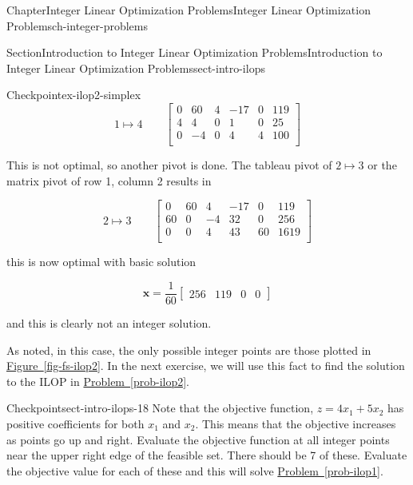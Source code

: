 \documentclass[oneside,10pt,]{book}
\newcommand{\xreffont}{\relax}
\numberwithin{equation}{section}
\newcommand{\amp}{&}
\begin{document}
\begin{chapterptx}{Chapter}{Integer Linear Optimization Problems}{}{Integer Linear Optimization Problems}{}{}{ch-integer-problems}
\begin{sectionptx}{Section}{Introduction to Integer Linear Optimization Problems}{}{Introduction to Integer Linear Optimization Problems}{}{}{sect-intro-ilops}
\begin{inlineexercise}{Checkpoint}{}{ex-ilop2-simplex}
\begin{equation*}
1 \mapsto 4 \qquad \left[\begin{array}{rr|rrr|r} 0 \amp 60 \amp 4 \amp -17 \amp 0 \amp 119\\ 4 \amp 4 \amp 0 \amp 1 \amp 0 \amp 25\\ \hline 0 \amp -4 \amp 0 \amp 4 \amp 4 \amp 100\\ \end{array} \right]
\end{equation*}
%
\par
This is not optimal, so another pivot is done. The tableau pivot of \(2 \mapsto 3\) or the matrix pivot of row 1, column 2 results in%
\par
%
\begin{equation*}
2 \mapsto 3 \qquad \left[\begin{array}{rr|rrr|r} 0 \amp 60 \amp 4 \amp -17 \amp 0 \amp 119\\ 60 \amp 0 \amp -4 \amp 32 \amp 0 \amp 256\\ \hline 0 \amp 0 \amp 4 \amp 43 \amp 60 \amp 1619\\ \end{array} \right]
\end{equation*}
%
\par
this is now optimal with basic solution%
\par
%
\begin{equation*}
\boldsymbol{x} = \frac{1}{60} \left[\begin{array}{rr|rr} 256 \amp 119 \amp 0 \amp 0 \end{array}\right]
\end{equation*}
%
\par
and this is clearly not an integer solution.%
\end{inlineexercise}%
As noted, in this case, the only possible integer points are those plotted in \hyperref[fig-fs-ilop2]{Figure~{\xreffont\ref{fig-fs-ilop2}}}. In the next exercise, we will use this fact to find the solution to the ILOP in \hyperref[prob-ilop2]{Problem~{\xreffont\ref{prob-ilop2}}}.%
\begin{inlineexercise}{Checkpoint}{}{sect-intro-ilops-18}%
Note that the objective function, \(z = 4x_1 + 5x_2\) has positive coefficients for both \(x_1\) and \(x_2\). This means that the objective increases as points go up and right. Evaluate the objective function at all integer points near the upper right edge of the feasible set.         There should be 7 of these. Evaluate the objective value for each of these and this will solve \hyperref[prob-ilop1]{Problem~{\xreffont\ref{prob-ilop1}}}.%

\end{inlineexercise}
\end{sectionptx}
\end{chapterptx}
\end{document}
